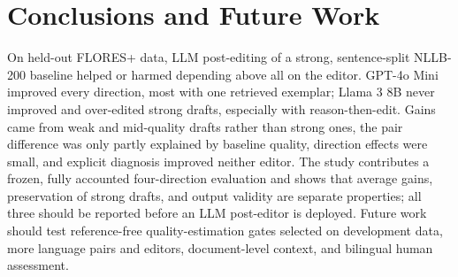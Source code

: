 \section{Conclusions and Future Work}
On held-out FLORES+ data, LLM post-editing of a strong, sentence-split NLLB-200 baseline helped or harmed depending above all on the editor. GPT-4o Mini improved every direction, most with one retrieved exemplar; Llama 3 8B never improved and over-edited strong drafts, especially with reason-then-edit. Gains came from weak and mid-quality drafts rather than strong ones, the pair difference was only partly explained by baseline quality, direction effects were small, and explicit diagnosis improved neither editor. The study contributes a frozen, fully accounted four-direction evaluation and shows that average gains, preservation of strong drafts, and output validity are separate properties; all three should be reported before an LLM post-editor is deployed. Future work should test reference-free quality-estimation gates selected on development data, more language pairs and editors, document-level context, and bilingual human assessment.
